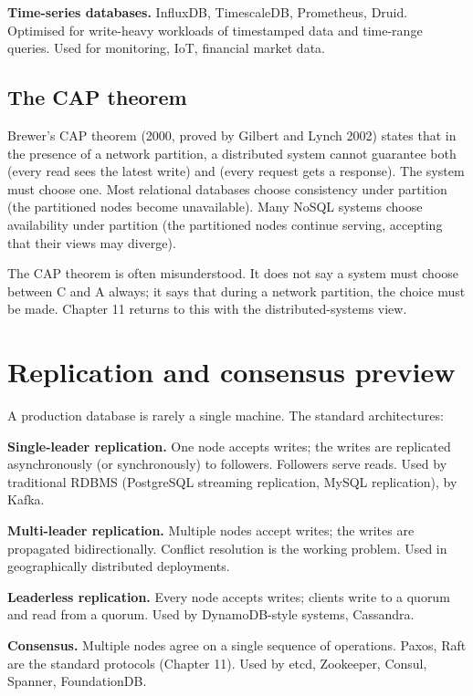 \textbf{Time-series databases.} InfluxDB, TimescaleDB, Prometheus, Druid. Optimised for write-heavy workloads of timestamped data and time-range queries. Used for monitoring, IoT, financial market data.

\subsection{The CAP theorem}

Brewer's CAP theorem (2000, proved by Gilbert and Lynch 2002) states that in the presence of a network partition, a distributed system cannot guarantee both  (every read sees the latest write) and  (every request gets a response). The system must choose one. Most relational databases choose consistency under partition (the partitioned nodes become unavailable). Many NoSQL systems choose availability under partition (the partitioned nodes continue serving, accepting that their views may diverge).

The CAP theorem is often misunderstood. It does not say a system must choose between C and A always; it says that during a network partition, the choice must be made. Chapter 11 returns to this with the distributed-systems view.

\section{Replication and consensus preview}

A production database is rarely a single machine. The standard architectures:

\textbf{Single-leader replication.} One node accepts writes; the writes are replicated asynchronously (or synchronously) to followers. Followers serve reads. Used by traditional RDBMS (PostgreSQL streaming replication, MySQL replication), by Kafka.

\textbf{Multi-leader replication.} Multiple nodes accept writes; the writes are propagated bidirectionally. Conflict resolution is the working problem. Used in geographically distributed deployments.

\textbf{Leaderless replication.} Every node accepts writes; clients write to a quorum and read from a quorum. Used by DynamoDB-style systems, Cassandra.

\textbf{Consensus.} Multiple nodes agree on a single sequence of operations. Paxos, Raft are the standard protocols (Chapter 11). Used by etcd, Zookeeper, Consul, Spanner, FoundationDB.

